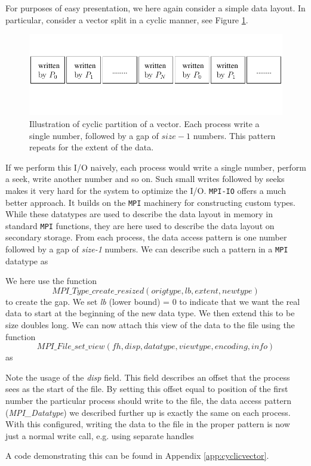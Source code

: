 \documentclass[twoside, 11pt, a4paper]{article}
\begin{document}
For purposes of easy presentation, we here again consider a simple data layout.
In particular, consider a vector split in a cyclic manner, see Figure
\ref{fig:cyclicvector}. 

\begin{figure}[ht]
	\begin{center}
		\includegraphics[width=12cm]{splitvector}
	\end{center}
	\caption{Illustration of cyclic partition of a vector. Each process
			 write a single number, followed by a gap of $size-1$ numbers.
			 This pattern repeats for the extent of the data.}
	\label{fig:cyclicvector}
\end{figure}
If we perform this I/O naively, each process would write a single number, perform
a seek, write another number and so on. Such small writes followed by seeks makes
it very hard for the system to optimize the I/O. \texttt{MPI-IO} offers a much better
approach. It builds on the \texttt{MPI} machinery for constructing custom types.
While these datatypes are used to describe the data layout in memory in standard 
\texttt{MPI} functions, they are here used to describe the data layout on secondary
storage. From each process, the data access pattern is one number followed
by a gap of \emph{size-1} numbers. We can describe such a pattern in a \texttt{MPI}
datatype as

We here use the function
\[
	MPI\_Type\_create\_resized(origtype,lb,extent,newtype)
\]
to create the gap. We set \emph{lb} (lower bound) = 0 to indicate that we want the real
data to start at the beginning of the new data type. We then extend this to be
size doubles long. We can now attach this view of the data to the file using
the function
\newpage
\[
	MPI\_File\_set\_view(fh,disp,datatype,viewtype,encoding,info)
\]
as

Note the usage of the \emph{disp} field. This field describes an offset that the
process sees as the start of the file. By setting this offset equal to position
of the first number the particular process should write to the file, the
data access pattern (\emph{MPI\_Datatype}) we described further up is exactly
the same on each process. With this configured, writing the data to the file in 
the proper pattern is now just a normal write call, e.g. using separate handles

A code demonstrating this can be found in Appendix \ref{app:cyclicvector}.
\end{document}
